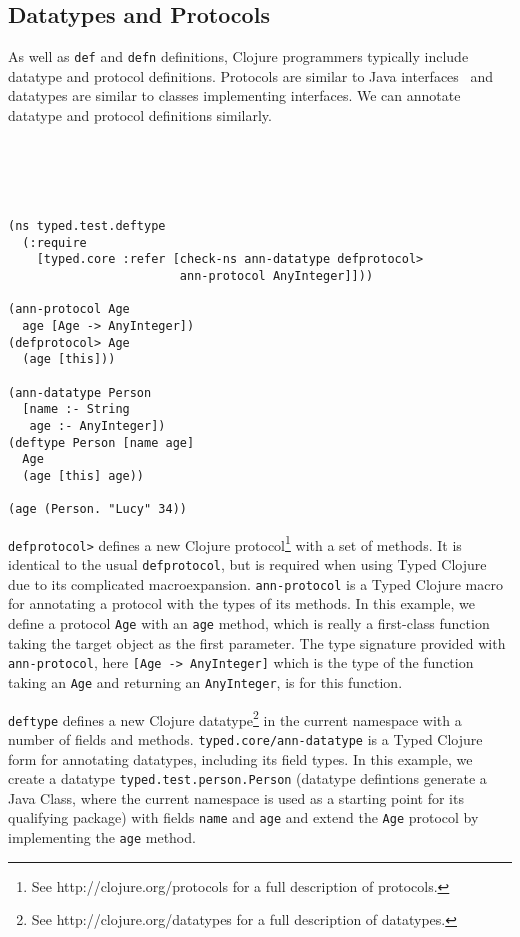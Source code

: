 \subsection{Datatypes and Protocols}
\label{sec:datatypes}

As well as \lstinline|def| and \lstinline|defn| definitions,
Clojure programmers typically include datatype and protocol
definitions. 
Protocols are similar to Java interfaces~\cite{InterfaceTutorial} and datatypes are similar to classes implementing interfaces.
We can annotate datatype and protocol definitions similarly.
\\\\\\\\\\
\begin{lstlisting}[caption=Annotating protocols and datatypes in Typed Clojure]
(ns typed.test.deftype
  (:require 
    [typed.core :refer [check-ns ann-datatype defprotocol>
                        ann-protocol AnyInteger]]))

(ann-protocol Age 
  age [Age -> AnyInteger])
(defprotocol> Age
  (age [this]))

(ann-datatype Person 
  [name :- String
   age :- AnyInteger])
(deftype Person [name age]
  Age
  (age [this] age))

(age (Person. "Lucy" 34))
\end{lstlisting}

\lstinline|defprotocol>| defines a new Clojure protocol\footnote{See http://clojure.org/protocols for a full description of protocols.}
with a set of methods. It is identical to the usual \lstinline|defprotocol|, but is required when using Typed Clojure
due to its complicated macroexpansion.
\lstinline|ann-protocol| is a Typed Clojure macro for annotating 
a protocol with the types of its methods.
In this example, we define a protocol \lstinline|Age| with an \lstinline|age| method,
which is really a first-class function taking the target object as the first parameter. The
type signature provided with \lstinline|ann-protocol|, here \lstinline|[Age -> AnyInteger]|
which is the type of the function taking an \lstinline|Age| and returning an \lstinline|AnyInteger|,
is for this function.

\lstinline|deftype|
defines a new Clojure datatype\footnote{See http://clojure.org/datatypes for a full description of datatypes.}
in the current namespace with a number of fields and methods. 
\lstinline|typed.core/ann-datatype| is a Typed Clojure form for annotating datatypes, including its field types.
In this example, we create a datatype \lstinline|typed.test.person.Person|
(datatype defintions generate a Java Class, where the current namespace is used as a starting point for its
qualifying package)
with fields \lstinline|name| and \lstinline|age| and 
extend the \lstinline|Age| protocol by implementing the \lstinline|age| method.

